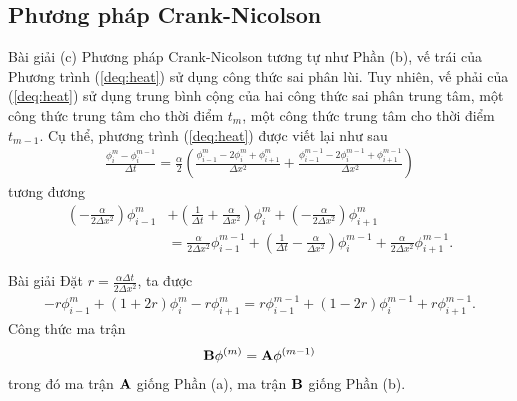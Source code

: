 \documentclass[9pt]{beamer}
\numberwithin{equation}{section}
\begin{document}
\subsection{Phương pháp Crank-Nicolson}

\begin{frame}
\begin{exampleblock}{Bài giải}
    (c) Phương pháp Crank-Nicolson tương tự như Phần (b), vế trái của Phương trình (\ref{deq:heat}) sử dụng công thức sai phân lùi. Tuy nhiên, vế phải của (\ref{deq:heat}) sử dụng trung bình cộng của hai công thức sai phân trung tâm, một công thức trung tâm cho thời điểm $t_m$, một công thức trung tâm cho thời điểm $t_{m-1}$. Cụ thể, phương trình (\ref{deq:heat}) được viết lại như sau
    \begin{align*}
        \frac{\phi_i^m - \phi_i^{m-1}}{\Delta t} =
        \frac{\alpha}{2} \left(
        \frac{\phi_{i-1}^m - 2\phi_i^m + \phi_{i+1}^m}{\Delta x^2} +
        \frac{\phi_{i-1}^{m-1} - 2\phi_i^{m-1} + \phi_{i+1}^{m-1}}{\Delta x^2}
        \right)
    \end{align*}
    tương đương
    \begin{align*}
        \left(-\frac{\alpha}{2\Delta x^2}\right) \phi_{i-1}^m &+
        \left(\frac{1}{\Delta t} + \frac{\alpha}{\Delta x^2}\right) \phi_i^m +
        \left(-\frac{\alpha}{2\Delta x^2}\right) \phi_{i+1}^m \nonumber \\ &=
        \frac{\alpha}{2\Delta x^2} \phi_{i-1}^{m-1} +
        \left(\frac{1}{\Delta t} - \frac{\alpha}{\Delta x^2}\right) \phi_i^{m-1} +
        \frac{\alpha}{2\Delta x^2} \phi_{i+1}^{m-1}.
    \end{align*}
\end{exampleblock}
\end{frame}

\begin{frame}
\begin{exampleblock}{Bài giải}
    Đặt $r = \frac{\alpha \Delta t}{2\Delta x^2}$, ta được
    \begin{align}
        -r\phi_{i-1}^m + (1+2r)\phi_i^m -r\phi_{i+1}^m = r\phi_{i-1}^{m-1} + (1-2r)\phi_i^{m-1} + r\phi_{i+1}^{m-1}. \label{deq:heat:cn}
    \end{align}
    Công thức ma trận
    \begin{align*}
        {\bf B} \phi^{(m)} = {\bf A} \phi^{(m-1)}
    \end{align*}
    trong đó ma trận ${\bf A}$ giống Phần (a), ma trận ${\bf B}$ giống Phần (b).
\end{exampleblock}
\end{frame}
\end{document}
